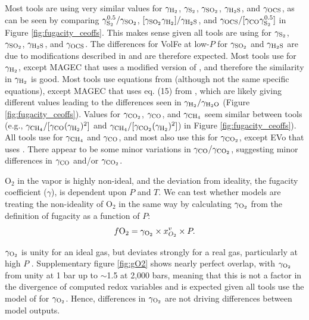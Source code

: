 \documentclass[draft, english]{volcanica-template}
\begin{document}
Most tools are using very similar values for $\gamma_{\rm{H_2}}$, $\gamma_{\rm{S_2}}$, $\gamma_{\rm{SO_2}}$, $\gamma_{\rm{H_2S}}$, and $\gamma_{\rm{OCS}}$, as can be seen by comparing $\gamma_{\rm{S_{2}}}^{0.5}/\gamma_{\rm{SO_{2}}}$, $[\gamma_{\rm {SO_2}}\gamma_{\rm {H_2}}]/\gamma_{\rm{H_2S}}$, and $\gamma_{\rm {OCS}}/[\gamma_{\rm {CO}}\gamma_{\rm {S_2}}^{0.5}]$ in Figure \ref{fig:fugacity_ceoffs}. This makes sense given all tools are using \textcite{shi1992} for $\gamma_ {\rm S_2}$, $\gamma_ {\rm SO_2}$, $\gamma_ {\rm H_2S}$, and $\gamma_ {\rm OCS}$. The differences for VolFe at low-$P$ for $\gamma_ {\rm SO_2}$ and $\gamma_ {\rm H_2S}$ are due to modifications described in \textcite{Hughes2023,hughes2024} and are therefore expected. Most tools use \textcite{shaw1964} for $\gamma_ {\rm H_2}$, except MAGEC that uses a modified version of \textcite{shi1992}, and therefore the similarity in $\gamma_ {\rm H_2}$ is good. Most tools use equations from \textcite{holland1991} (although not the same specific equations), except MAGEC that uses eq. (15) from \textcite{peng1976}, which are likely giving different values leading to the differences seen in $\gamma_ {\rm H_2}/\gamma_{\rm H_2O}$ (Figure \ref{fig:fugacity_ceoffs}). Values for $\gamma_{\rm CO_2}$, $\gamma_{\rm CO}$, and $\gamma_{\rm CH_4}$ seem similar between tools (e.g., $\gamma_{\rm {CH_4}}/[\gamma_ {\rm {CO}}(\gamma_{\rm{H_2}})^2]$ and  $\gamma_{\rm {CH_4}}/[\gamma_{\rm {CO_2}}(\gamma_{\rm{H_2}})^2]$) in Figure \ref{fig:fugacity_ceoffs}). All tools use \textcite{shi1992} for $\gamma_{\rm {CH_4}}$ and $\gamma_{\rm {CO}}$, and most also use this for $\gamma_{\rm {CO_2}}$, except EVo that uses \textcite{holland1991}. There appear to be some minor variations in  $\gamma_{\rm {CO}}/\gamma_{\rm {CO_2}}$, suggesting minor differences in $\gamma_{\rm {CO}}$ and/or $\gamma_{\rm {CO_2}}$.

 O$_2$ in the vapor is highly non-ideal, and the deviation from ideality, the fugacity coefficient ($\gamma$), is dependent upon $P$ and $T$. We can test whether models are treating the non-ideality of O$_2$ in the same way by calculating $\gamma_{\rm O_2}$ from the definition of fugacity as a function of $P$:
 \begin{equation}
    f {\rm O_2} = \gamma_{\rm O_2} \times x_{O_{2}}^{v} \times P.
 \end{equation}

\noindent $\gamma_{\rm O_2}$ is unity for an ideal gas, but deviates strongly for a real gas, particularly at high $P$ \parencite[e.g.,][]{shi1992}. Supplementary figure \ref{fig:gO2} shows nearly perfect overlap, with $\gamma_{\rm O_2}$ from unity at 1 bar up to $\sim$1.5 at 2,000 bars, meaning that this is not a factor in the divergence of computed redox variables and is expected given all tools use the model of \textcite{shi1992} for $\gamma_{\rm O_2}$. Hence, differences in $\gamma _{\rm O _2}$ are not driving differences between model outputs.
\end{document}
